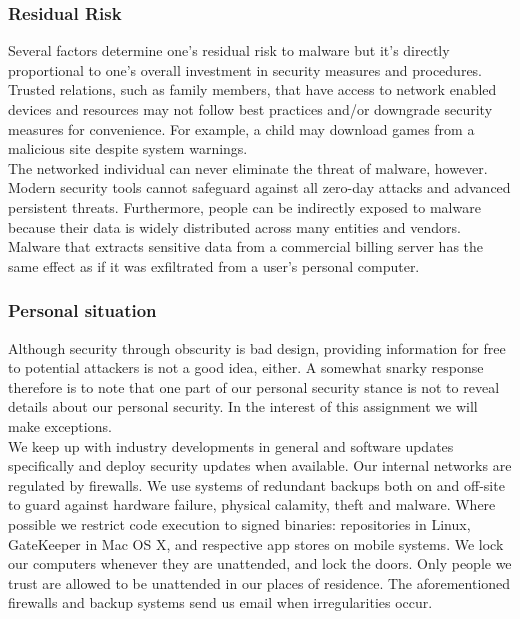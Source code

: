 \documentclass[a4paper]{llncs}
\begin{document}
\subsubsection{Residual Risk}
Several factors determine one’s residual risk to malware but it’s directly proportional to one’s overall investment in security measures and procedures. Trusted relations, such as family members, that have access to network enabled devices and resources may not follow best practices and/or downgrade security measures for convenience. For example, a child may download games from a malicious site despite system warnings.\\

The networked individual can never eliminate the threat of malware, however. Modern security tools cannot safeguard against all zero-day attacks and advanced persistent threats. Furthermore, people can be indirectly exposed to malware because their data is widely distributed across many entities and vendors. Malware that extracts sensitive data from a commercial billing server has the same effect as if it was exfiltrated from a user’s personal computer.\\

\subsubsection{Personal situation}
Although security through obscurity is bad design, providing information for free to potential attackers is not a good idea, either. A somewhat snarky response therefore is to note that one part of our personal security stance is not to reveal details about our personal security. In the interest of this assignment we will make exceptions.\\

We keep up with industry developments in general and software updates specifically and deploy security updates when available. Our internal networks are regulated by firewalls. We use systems of redundant backups both on and off-site to guard against hardware failure, physical calamity, theft and malware. Where possible we restrict code execution to signed binaries: repositories in Linux, GateKeeper in Mac OS X, and respective app stores on mobile systems. We lock our computers whenever they are unattended, and lock the doors. Only people we trust are allowed to be unattended in our places of residence. The aforementioned firewalls and backup systems send us email when irregularities occur.
\end{document}
